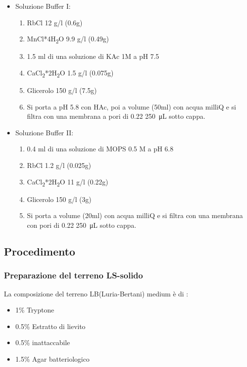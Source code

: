 \begin{itemize}

  \item Soluzione Buffer I:
  \begin{enumerate}
    \item RbCl 12 g/l (0.6g)
    \item MnCl*4H\textsubscript{2}O 9.9 g/l (0.49g)
    \item 1.5 ml di una soluzione di KAc 1M a pH 7.5
    \item CaCl\textsubscript{2}*2H\textsubscript{2}O 1.5 g/l (0.075g)
    \item Glicerolo 150 g/l (7.5g)
    \item Si porta a pH 5.8 con HAc, poi a volume (50ml) con acqua milliQ e si filtra con una membrana a pori di 0.22 \SI{250}{\micro\liter} sotto cappa.
  \end{enumerate}
  \item Soluzione Buffer II:
  \begin{enumerate}
    \item 0.4 ml di una soluzione di MOPS 0.5 M a pH 6.8
    \item RbCl 1.2 g/l (0.025g)
    \item CaCl\textsubscript{2}*2H\textsubscript{2}O 11 g/l (0.22g)
    \item Glicerolo 150 g/l (3g)
    \item Si porta a volume (20ml) con acqua milliQ e si filtra con una membrana con pori di 0.22 \SI{250}{\micro\liter} sotto cappa.
  \end{enumerate}

\end{itemize}

\subsection{Procedimento}

\subsubsection{Preparazione del terreno LS-solido}

La composizione del terreno LB(Luria-Bertani) medium è di :

\begin{itemize}
  \item 1\% Tryptone
  \item 0.5\% Estratto di lievito
  \item 0.5\% inattaccabile
  \item 1.5\% Agar batteriologico
\end{itemize}

